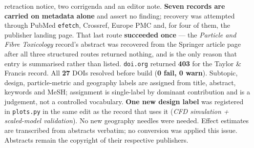 \documentclass[10pt]{article}
\begin{document}
\begin{keybox}
{retraction notice, two corrigenda and an editor note.
\textbf{Seven records are carried on metadata alone} and assert no finding; recovery was
attempted through PubMed \texttt{efetch}, Crossref, Europe PMC and, for four of them, the
publisher landing page. That last route \textbf{succeeded once} --- the \textit{Particle and
Fibre Toxicology} record's abstract was recovered from the Springer article page after all
three structured routes returned nothing, and is the only reason that entry is summarised
rather than listed. \texttt{doi.org} returned \textbf{403} for the Taylor \& Francis
record. All \textbf{27} DOIs resolved before build (\textbf{0 fail, 0 warn}).
Subtopic, design, particle-metric and geography labels are assigned from title, abstract,
keywords and MeSH; assignment is single-label by dominant contribution and is a judgement,
not a controlled vocabulary. \textbf{One new design label} was registered in
\texttt{plots.py} in the same edit as the record that uses it (\textit{CFD simulation +
scaled-model validation}). No new geography needles were needed. Effect estimates are
transcribed from abstracts verbatim; no conversion was applied this issue. Abstracts remain
the copyright of their respective publishers.\par}
\end{keybox}
\end{document}
